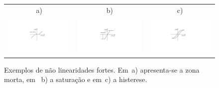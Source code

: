 %
\begin{figure}[htb]
	\centering
	\begin{tabular}{ccc}
		a) & b) & c)\\
		\includegraphics[scale=0.56,trim=115mm 70mm 135mm 55mm,clip=true]{figuras/cap1_zona_morta} &
		\includegraphics[scale=0.56,trim=115mm 70mm 135mm 55mm,clip=true]{figuras/cap1_saturacao} &
		\includegraphics[scale=0.56,trim=115mm 70mm 135mm 55mm,clip=true]{figuras/cap1_histerese}
	\end{tabular}
	\caption[Exemplos de não linearidades fortes.]{Exemplos de não linearidades fortes. Em~a) apresenta-se a zona morta, em ~b) a saturação e em~c) a histerese.}
	\label{fig:cap1_hist_sat_zmorta}
\end{figure}
